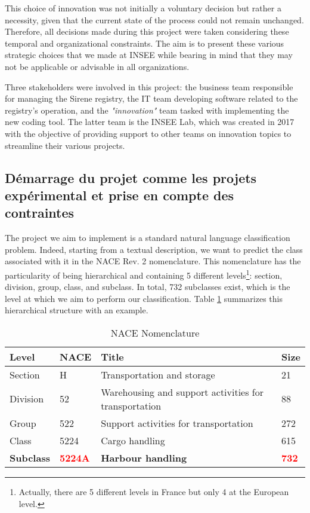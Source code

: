 This choice of innovation was not initially a voluntary decision but rather a necessity, given that the current state of the process could not remain unchanged. Therefore, all decisions made during this project were taken considering these temporal and organizational constraints. The aim is to present these various strategic choices that we made at INSEE while bearing in mind that they may not be applicable or advisable in all organizations.

Three stakeholders were involved in this project: the business team responsible for managing the Sirene registry, the IT team developing software related to the registry's operation, and the \textit{"innovation"} team tasked with implementing the new coding tool. The latter team is the INSEE Lab, which was created in 2017 with the objective of providing support to other teams on innovation topics to streamline their various projects.

\subsection{Démarrage du projet comme les projets expérimental et prise en compte des contraintes}


The project we aim to implement is a standard natural language classification problem. Indeed, starting from a textual description, we want to predict the class associated with it in the NACE Rev. 2 nomenclature. This nomenclature has the particularity of being hierarchical and containing 5 different levels\footnote{Actually, there are 5 different levels in France but only 4 at the European level.}: section, division, group, class, and subclass. In total, 732 subclasses exist, which is the level at which we aim to perform our classification. Table \ref{tab:nace-nomenclature} summarizes this hierarchical structure with an example.

\begin{table}[htbp]
    \centering
    \begin{tabular}{llll}
    \textbf{Level} & \textbf{NACE} & \textbf{Title} & \textbf{Size} \\ \hline
    Section & H & Transportation and storage & 21 \\ \hline
    Division & 52 & Warehousing and support activities for transportation & 88 \\ \hline
    Group & 522 & Support activities for transportation & 272 \\ \hline
    Class & 5224 & Cargo handling & 615 \\ \hline
    \textbf{Subclass} & \textbf{\textcolor{red}{5224A}} & \textbf{Harbour handling} & \textbf{\textcolor{red}{732}} \\ 
    \end{tabular}
    \caption{NACE Nomenclature}
    \label{tab:nace-nomenclature}
    \end{table}
    

